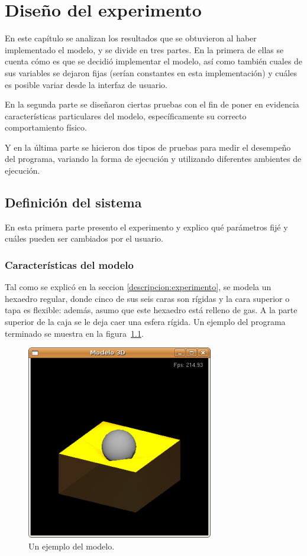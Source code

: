 \chapter{Diseño del experimento}
En este capítulo se analizan los resultados que se obtuvieron al haber implementado el modelo, y se divide en tres partes. En la primera de ellas se cuenta cómo es que se decidió implementar el modelo, así como también cuales de sus variables se dejaron fijas (serían constantes en esta implementación) y cuáles es posible variar desde la interfaz de usuario.

En la segunda parte se diseñaron ciertas pruebas con el fin de poner en evidencia características particulares del modelo, específicamente su correcto comportamiento físico.

Y en la última parte se hicieron dos tipos de pruebas para medir el desempeño del programa, variando la forma de ejecución y utilizando diferentes ambientes de ejecución.

\section{Definición del sistema}
En esta primera parte presento el experimento y explico qué parámetros fijé y cuáles pueden ser cambiados por el usuario.
\subsection{Características del modelo}
Tal como se explicó en la seccion \ref{descripcion:experimento}, se modela un hexaedro regular, donde cinco de sus seis caras son rígidas y la cara superior o tapa es flexible: además, asumo que este hexaedro está relleno de gas. A la parte superior de la caja se le deja caer una esfera rígida.
Un ejemplo del programa terminado se muestra en la figura~\ref{programa:portada}.
\begin{figure}
 \centering
 \includegraphics[]{Img/modeloPortada}
 \caption[Ejemplo del programa en ejecución]{Un ejemplo del modelo.}
 \label{programa:portada}
\end{figure}
